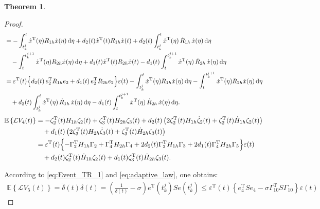 \documentclass[preprint,review,fleqn,sort&compress,3p]{elsarticle}
\theoremstyle{definition} %
\theoremstyle{definition}%
\newtheorem{thm}{Theorem}[section]
\begin{document}
\begin{thm}
\begin{proof}
\begin{align}
				&= - \int_{t_k^j}^{t} \dot{x}^\mathrm{T}(\eta) R_{1h} \dot{x}(\eta) \,\mathrm{d}\eta 
				+ d_2(t) \dot{x}^\mathrm{T}(t) R_{1h} \dot{x}(t)
				+ d_2(t)\int_{t_k^j}^{t} \dot{x}^\mathrm{T}(\eta)\,\dot{R}_{1h}\,\dot{x}(\eta)\,\mathrm{d}\eta \nonumber \\
				&\quad -\int_{t}^{t_{k}^{j+1}} \dot{x}^\mathrm{T}(\eta) R_{2h} \dot{x}(\eta) \,\mathrm{d}\eta
				+ d_1(t) \dot{x}^\mathrm{T}(t) R_{2h}\dot{x}(t)
				- d_1(t)\int_{t}^{t_k^{j+1}} \dot{x}^\mathrm{T}(\eta)\,\dot{R}_{2h}\,\dot{x}(\eta)\,\mathrm{d}\eta \nonumber \\
				&= \varepsilon^\mathrm{T}(t) 
				\Bigl\{ d_2(t)\, e_{2}^\mathrm{T} R_{1h} e_{2} 
				+ d_1(t)\, e_{2}^\mathrm{T} R_{2h} e_{2} \Bigr\} \varepsilon(t)  -\int_{t_k^j}^{t} \dot{x}^\mathrm{T}(\eta) R_{1h} \dot{x}(\eta) \,\mathrm{d}\eta
				-\int_{t}^{t_{k}^{j+1}} \dot{x}^\mathrm{T}(\eta) R_{2h} \dot{x}(\eta) \,\mathrm{d}\eta \nonumber \\
				&\quad + d_2(t)\int_{t_k^j}^{t} \dot{x}^\mathrm{T}(\eta)\,\dot{R}_{1h}\,\dot{x}(\eta)\,\mathrm{d}\eta
				- d_1(t)\int_{t}^{t_k^{j+1}} \dot{x}^\mathrm{T}(\eta)\,\dot{R}_{2h}\,\dot{x}(\eta)\,\mathrm{d}\eta .
			\end{align}
			\begin{align}
				\mathbb{E} \left\{ \mathcal{L}V_{4}(t) \right\} 
				&= -\zeta_2^{\mathrm{T}}(t) H_{1h} \zeta_2(t) + \zeta_3^{\mathrm{T}}(t) H_{2h} \zeta_3(t) + d_2(t) \left( 2\zeta_2^{\mathrm{T}}(t) H_{1h} \dot{\zeta}_2(t) + \zeta_2^{\mathrm{T}}(t) \dot{H}_{1h} \zeta_2(t) \right) \nonumber \\
				&\quad + d_1(t) \left( 2\zeta_3^{\mathrm{T}}(t) H_{2h} \dot{\zeta}_3(t) + \zeta_3^{\mathrm{T}}(t) \dot{H}_{2h} \zeta_3(t) \right) \nonumber \\
				&= \varepsilon^{\mathrm{T}}(t) 
				\Bigl\{ -\Gamma_{2}^{\mathrm{T}} H_{1h} \Gamma_{2}
				+ \Gamma_{4}^{\mathrm{T}} H_{2h} \Gamma_{4}
				+ 2d_2(t) \Gamma_{2}^{\mathrm{T}} H_{1h} \Gamma_{3}
				+ 2d_1(t) \Gamma_{4}^{\mathrm{T}} H_{2h} \Gamma_{5} \Bigr\} \varepsilon(t) \nonumber \\
				&\quad + d_2(t) \zeta_2^{\mathrm{T}}(t) \dot{H}_{1h} \zeta_2(t)
				+ d_{1}(t) \zeta_3^{\mathrm{T}}(t) \dot{H}_{2h} \zeta_3(t).
			\end{align}
			
			According to \eqref{eq:Event_TR_1} and \eqref{eq:adaptive_law}, one obtains:
			\begin{align}
				\mathbb{E} \left\{ \mathcal{L}V_{5}(t) \right\}
				= 
				\dot{\delta}(t) \delta(t)
				=\left( \frac{1}{\delta(t)} - \sigma \right) e^{\mathrm{T}}(t^j_{k}) S e(t^j_{k})
				\leq \varepsilon^{\mathrm{T}}(t) 
				\left\lbrace 
				e_{4}^{\mathrm{T}} S e_{4}  
				-\sigma \Gamma_{10}^{\mathrm{T}} S \Gamma_{10}
				\right\rbrace 
				\varepsilon(t)
			\end{align}
			

\end{proof}
\end{thm}
\end{document}

